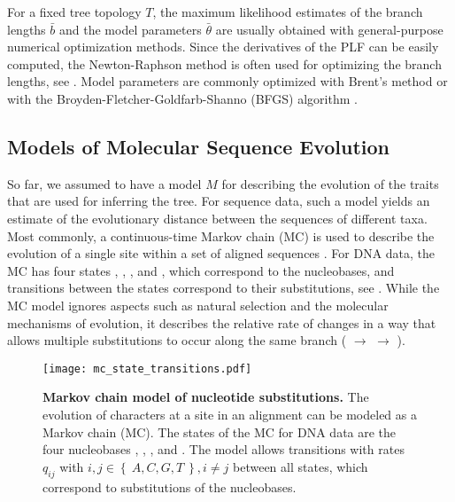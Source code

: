For a fixed tree topology $T$, the maximum likelihood estimates
of the branch lengths $\bar{b}$ and the model parameters $\bar{\theta}$
are usually obtained with general-purpose numerical optimization methods.
Since the derivatives of the PLF can be easily computed,
the Newton-Raphson method \cite{Ypma1995} is often used for optimizing the branch lengths,
see .
Model parameters are commonly optimized with Brent's method \cite{Brent1971}
or with the Broyden-Fletcher-Goldfarb-Shanno (BFGS) algorithm \cite{Fletcher1987}.


\subsection{Models of Molecular Sequence Evolution}
\label{ch:Foundations:sec:MLTreeInference:sub:ModelsOfSeqEvol}

So far, we assumed to have a model $M$ for describing the evolution of the traits that are used for inferring the tree.
For sequence data, such a model yields an estimate of the evolutionary distance between the sequences of different taxa.
Most commonly, a continuous-time Markov chain (MC) is used to describe
the evolution of a single site within a set of aligned sequences \cite{Gagniuc2017}.
For DNA data, the MC has four states , , , and ,
which correspond to the nucleobases, and transitions between the states correspond to their substitutions,
see .
While the MC model ignores aspects such as natural selection and the molecular mechanisms of evolution,
it describes the relative rate of changes in a way that allows multiple substitutions to occur
along the same branch ( $\rightarrow$  $\rightarrow$ ).

\begin{figure}[hpbt]
    \centering
    \texttt{[image: mc\_state\_transitions.pdf]}
    \caption[Markov chain model of nucleotide substitutions]{
        \textbf{Markov chain model of nucleotide substitutions.}
        The evolution of characters at a site in an alignment can be modeled as a Markov chain (MC).
        The states of the MC for DNA data are the four nucleobases
        , , , and .
        The model allows transitions with rates $q_{ij}$ with $i,j \in \left\{~ A, C, G, T ~\right\}, i \neq j$ between all states,
        which correspond to substitutions of the nucleobases.
    }
    \label{fig:mc_state_transitions}
\end{figure}

